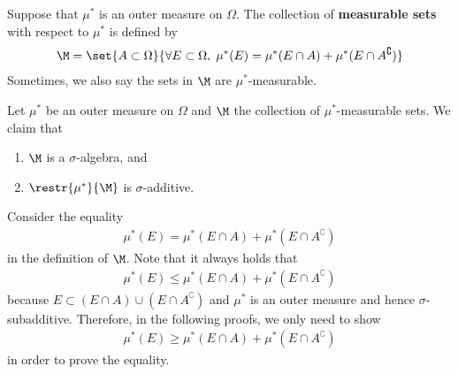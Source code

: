 \documentclass[thmcnt=section, 12pt]{elegantbook}
\begin{document}

\begin{definition}
    Suppose that $ \mu^\ast $ is an outer measure on $ \Omega $. The collection of \textbf{measurable sets} with respect to $ \mu^\ast $ is defined by 
    \begin{align*}
        \M = \set{A \subset \Omega}{\forall E \subset \Omega, \; \mu^\ast(E) = \mu^\ast(E \cap A) + \mu^\ast(E \cap A^\complement)}
    \end{align*}
    Sometimes, we also say the sets in $ \M $ are $ \mu^\ast $-measurable.
\end{definition}


\begin{theorem} \label{thm:4} %
    Let $ \mu^\ast $ be an outer measure on $ \Omega $ and $ \M $ the collection of $ \mu^\ast $-measurable sets. We claim that 
    \begin{enumerate}
        \item $ \M $ is a $ \sigma $-algebra, and
        \item $ \restr{\mu^\ast}{\M} $ is $ \sigma $-additive.
    \end{enumerate}
\end{theorem}

\par Consider the equality 
\begin{align*}
    \mu^\ast(E) = \mu^\ast(E \cap A) + \mu^\ast(E \cap A^\complement)
\end{align*}
in the definition of $ \M $. Note that it always holds that 
\begin{align*}
    \mu^\ast(E) \leq \mu^\ast(E \cap A) + \mu^\ast(E \cap A^\complement)
\end{align*}
because $ E \subset (E\cap A) \cup (E \cap A^\complement) $ and $ \mu^\ast $ is an outer measure and hence $ \sigma $-subadditive. Therefore, in the following proofs, we only need to show  
\begin{align*}
    \mu^\ast(E) \geq \mu^\ast(E \cap A) + \mu^\ast(E \cap A^\complement)
\end{align*}
in order to prove the equality.
\end{document}

